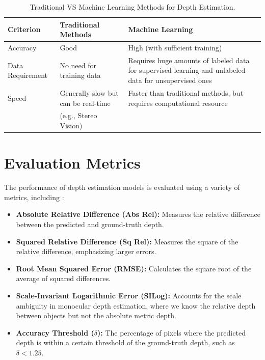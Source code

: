 \begin{table}[htbp!]
    \centering
    \caption{Traditional VS Machine Learning Methods for Depth Estimation.}
    \label{tab:method_comparison}
    \begin{tabularx}{\textwidth}{l >{\RaggedRight}X >{\RaggedRight\arraybackslash}X}
        \toprule
        \textbf{Criterion} & \textbf{Traditional Methods} & \textbf{Machine Learning} \\
        \midrule
        Accuracy & Good & High (with sufficient training) \\
        \addlinespace
        Data Requirement & No need for training data & Requires huge amounts of labeled data for supervised learning and unlabeled data for unsupervised ones \\
        \addlinespace
        Speed & Generally slow but can be real-time & Faster than traditional methods, but requires computational resource \\
        & (e.g., Stereo Vision) & \\
        \bottomrule
    \end{tabularx}
\end{table}

\section{Evaluation Metrics}
\label{sec:evaluation_metrics}
The performance of depth estimation models is evaluated using a variety of metrics, including \cite{gurram2023metrics}:
\begin{itemize}
    \item \textbf{Absolute Relative Difference (Abs Rel):} Measures the relative difference between the predicted and ground-truth depth.
    \item \textbf{Squared Relative Difference (Sq Rel):} Measures the square of the relative difference, emphasizing larger errors.
    \item \textbf{Root Mean Squared Error (RMSE):} Calculates the square root of the average of squared differences.
    \item \textbf{Scale-Invariant Logarithmic Error (SILog):} Accounts for the scale ambiguity in monocular depth estimation, where we know the relative depth between objects but not the absolute metric depth.
    \item \textbf{Accuracy Threshold ($\delta$):} The percentage of pixels where the predicted depth is within a certain threshold of the ground-truth depth, such as $\delta < 1.25$.
\end{itemize}

